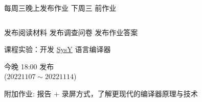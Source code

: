 \begin{frame}{}
  \begin{center}
    每周三晚上发布作业 \qquad 下周三  前作业
  \end{center}

  \begin{columns}
    \vspace{-0.80cm}
    \begin{center}
    \end{center}
  \end{columns}

  \vspace{0.30cm}
  \begin{center}
    发布阅读材料 \qquad 发布调查问卷 \qquad 发布作业答案
  \end{center}
\end{frame}

\begin{frame}{}
  \begin{center}
    课程实验：开发 \href{https://compiler.educg.net/}{\textsf{SysY}} 语言编译器


    \vspace{0.30cm}
  \end{center}
\end{frame}

\begin{frame}{}

  \vspace{0.20cm}
  \begin{center}
      今晚 18:00 发布 \\[5pt]
    ($20221107 \sim 20221114$)
  \end{center}
\end{frame}

\begin{frame}{}
  \begin{center}
    附加作业: 报告 + 录屏方式，了解更现代的编译器原理与技术 \\[6pt]

  \end{center}
\end{frame}

